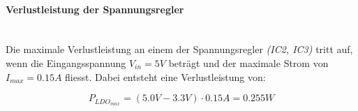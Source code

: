 \paragraph{Verlustleistung der Spannungsregler}\vspace{-0.3cm}\\
Die maximale Verlustleistung an einem der Spannungsregler \textit{(IC2, IC3)} tritt auf, wenn die Eingangsspannung ${V_{in}=5\si{V}}$ beträgt und der maximale Strom von ${I_{max}=0.15\si{A}}$ fliesst.
Dabei entsteht eine Verlustleistung von:

\begin{equation}
P_{LDO_{max}}=(5.0\si{V}-3.3\si{V})\cdot 0.15\si{A}=0.255\si{W}
\end{equation}


